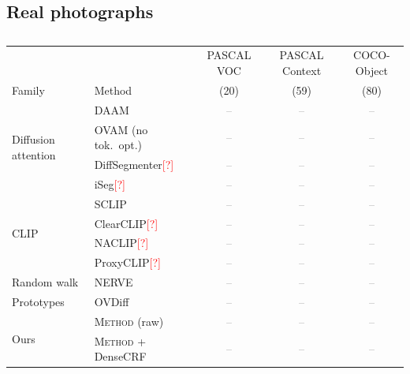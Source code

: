 \documentclass[runningheads]{llncs}
\newcommand{\method}{\textsc{Method}}          %
\newcommand{\x}{\textcolor{gray}{--}}          %
\newcommand{\citeneeded}{\textcolor{red}{[?]}} %
\begin{document}
\subsection{Real photographs}
\label{sec:res-real}

\begin{table}[t]
\centering
\caption{}
\label{tab:real}
\footnotesize\setlength{\tabcolsep}{3.5pt}
\begin{tabular}{@{}llccc@{}}
\toprule
 & & PASCAL VOC & PASCAL Context & COCO-Object \\
Family & Method & (20) & (59) & (80) \\
\midrule
\multirow{4}{*}{Diffusion attention}
 & DAAM~\cite{tang2023daam}            & \x & \x & \x \\
 & OVAM (no tok.\ opt.)~\cite{marcosmanchon2024ovam} & \x & \x & \x \\
 & DiffSegmenter\citeneeded            & \x & \x & \x \\
 & iSeg\citeneeded                     & \x & \x & \x \\
\midrule
\multirow{4}{*}{CLIP}
 & SCLIP~\cite{wang2024sclip}                    & \x & \x & \x \\
 & ClearCLIP\citeneeded                & \x & \x & \x \\
 & NACLIP\citeneeded                   & \x & \x & \x \\
 & ProxyCLIP\citeneeded                & \x & \x & \x \\
\midrule
Random walk & NERVE~\cite{mahatha2025nerve} & \x & \x & \x \\
\midrule
Prototypes & OVDiff~\cite{karazija2024ovdiff} & \x & \x & \x \\
\midrule
\multirow{2}{*}{Ours}
 & \method{} (raw)                     & \x & \x & \x \\
 & \method{} + DenseCRF                & \x & \x & \x \\
\bottomrule
\end{tabular}
\end{table}
\end{document}
